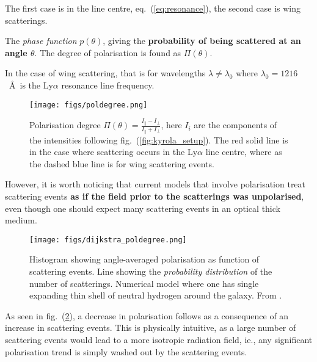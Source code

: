 \documentclass[ignorenonframetext]{beamer}
\begin{document}
The first case is in the line centre, eq.~(\ref{eq:resonance}), the second case is wing scatterings.

The \textit{phase function} $p(\theta)$, giving the \textbf{probability of being scattered at an angle $\theta$}. The degree of polarisation is found as $\Pi(\theta)$.

In the case of wing scattering, that is for wavelengths $\lambda \neq \lambda_0$ where $\lambda_0 = 1216$~\AA ~is the Ly$\alpha$ resonance line frequency.

\begin{frame}
    \begin{figure}[htb]
        \centering
        \texttt{[image: figs/poldegree.png]}
        \caption{Polarisation degree $\Pi(\theta) = \frac{I_{\parallel} - I_\perp}{I_\parallel + I_\perp}$, here $I_i$ are the components of the intensities following fig.~(\ref{fig:kyrola_setup}). The red solid line is in the case where scattering occurs in the Ly$\alpha$ line centre, where as the dashed blue line is for wing scattering events.}
        \label{fig:poldegree}
    \end{figure}
\end{frame}

However, it is worth noticing that current models that involve polarisation treat scattering events \textbf{as if the field prior to the scatterings was unpolarised}, even though one should expect many scattering events in an optical thick medium. 

\begin{frame}
    \begin{figure}[htb]
        \centering
        \texttt{[image: figs/dijkstra\_poldegree.png]}
        \caption{Histogram showing angle-averaged polarisation as function of scattering events. Line showing the {\em probability distribution} of the number of scatterings. Numerical model where one has single expanding thin shell of neutral hydrogen around the galaxy. From .}
        \label{fig:dijkstra_pol_scatterings}
    \end{figure}
\end{frame}

As seen in fig.~(\ref{fig:dijkstra_pol_scatterings}), a decrease in polarisation follows as a consequence of an increase in scattering events. This is physically intuitive, as a large number of scattering events would lead to a more isotropic radiation field, ie., any significant polarisation trend is simply washed out by the scattering events.
\end{document}
